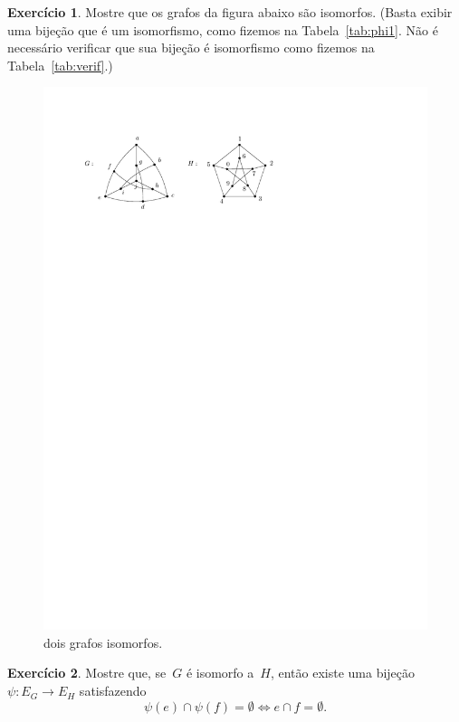 \documentclass[12pt, a4paper]{article}
\theoremstyle{definition}
\newtheorem{exer}{Exercício}
\begin{document}
\begin{exer}
Mostre que os grafos da figura abaixo são isomorfos. (Basta exibir uma bijeção que é um isomorfismo, como fizemos na Tabela~\ref{tab:phi1}. Não é necessário verificar que sua bijeção é isomorfismo como fizemos na Tabela~\ref{tab:verif}.)
\begin{figure}[H]
    \centering
    \includegraphics{petersen.pdf}
    \caption{dois grafos isomorfos.}
    \label{fig:pete}
\end{figure}
\end{exer}

\begin{exer}
  \label{exc:edge_map}
  Mostre que, se~$G$ é isomorfo a~$H$, então existe uma bijeção $\psi
  \colon E_G \rightarrow E_H$ satisfazendo
  \[
  \psi(e) \cap \psi(f) = \emptyset \iff e \cap f = \emptyset.
  \]
\end{exer}
\end{document}
